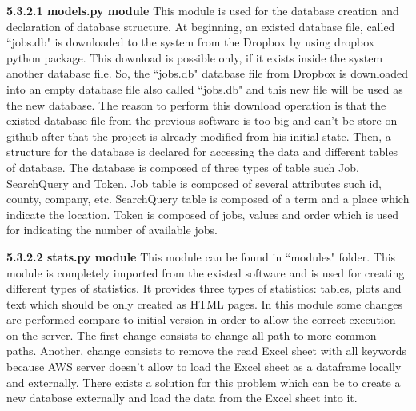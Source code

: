 \documentclass[conference,compsoc]{IEEEtran}
\begin{document}
\noindent
\newline\newline
\textbf{5.3.2.1 models.py module}
\newline\newline
This module is used for the database creation and declaration of database structure. At beginning, an existed database file, called ``jobs.db" is downloaded to the system from the Dropbox by using dropbox python package. This download is possible only, if it exists inside the system another database file. So, the ``jobs.db" database file from Dropbox is downloaded into an empty database file also called ``jobs.db" and this new file will be used as the new database. The reason to perform this download operation is that the existed database file from the previous software is too big and can't be store on github after that the project is already modified from his initial state.                                                  
\newline
Then, a structure for the database is declared for accessing the data and different tables of database. The database is composed of three types of table such Job, SearchQuery and Token. Job table is composed of several attributes such id, county, company, etc. SearchQuery table is composed of a term and a place which indicate the location. Token is composed of jobs, values and order which is used for indicating the number of available jobs. 

\noindent
\newline\newline
\textbf{5.3.2.2 stats.py module}
\newline\newline
This module can be found in ``modules" folder. This module is completely imported from the existed software and is used for creating different types of statistics. It provides three types of statistics: tables, plots and text which should be only created as HTML pages. In this module some changes are performed compare to initial version in order to allow the correct execution on the server. The first change consists to change all path to more common paths. Another, change consists to remove the read Excel sheet with all keywords because AWS server doesn't allow to load the Excel sheet as a dataframe locally and externally. There exists a solution for this problem which can be to create a new database externally and load the data from the Excel sheet into it.  
\end{document}
